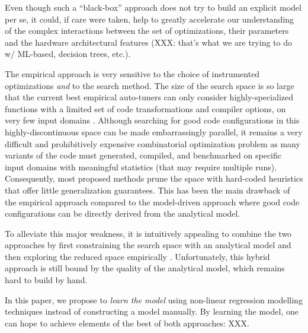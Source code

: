 \documentclass{sig-alternate}
\begin{document}
Even though such a ``black-box'' approach does not try to build an
explicit model per se, it could, if care were taken, help to greatly accelerate
our understanding of the complex interactions between the set of optimizations,
their parameters and the hardware architectural features (XXX: that's what
we are trying to do w/ ML-based, decision trees, etc.).


The empirical approach is very sensitive to the choice of instrumented
optimizations \emph{and} to the search method. The size of the search space is
so large that the current best empirical auto-tuners can only consider
highly-specialized functions with a limited set of code transformations and
compiler options, on very few input domains \citep{ganapathi2009case}. Although
searching for good code configurations in this highly-discontinuous space can
be made embarrassingly parallel, it remains a very difficult and prohibitively
expensive combinatorial optimization problem as many variants of the code must
generated, compiled, and benchmarked on specific input domains with meaningful
statistics (that may require multiple runs). Consequently, most proposed
methods prune the space with hard-coded heuristics that offer little
generalization guarantees. This has been the main drawback of the empirical
approach compared to the model-driven approach where good code configurations
can be directly derived from the analytical model.


To alleviate this major weakness, it is intuitively appealing to combine the two
approaches by first constraining the search space with an analytical model and
then exploring the reduced space empirically \citep{chen2005combining,
li2009note}. Unfortunately, this hybrid approach is still bound by the quality
of the analytical model, which remains hard to build by hand.


In this paper, we propose to \emph{learn the model} using non-linear regression
modelling techniques instead of constructing a model manually. By learning the model, one can
hope to achieve elements of the best of both approaches: XXX.
\end{document}
